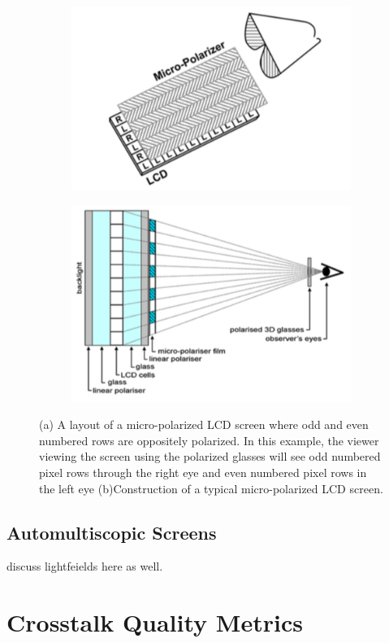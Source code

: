 \begin{figure}[htbp]
\centering
     \begin{subfigure}[b]{0.6\textwidth}
        \includegraphics[width=\textwidth]{./Template_Figures/polarized_lcd}
        \caption{ }\label{fig:polarized_lcd}
    \end{subfigure}
    \begin{subfigure}[b]{0.6\textwidth}
        \includegraphics[width=\textwidth]{./Template_Figures/polarized_lcd_problem}
        \caption{ }\label{fig:polarized_lcd_prob}
    \end{subfigure}

    \caption{(a) A layout of a micro-polarized LCD screen where odd and even numbered rows are oppositely polarized. In this example, the viewer viewing the screen using the polarized glasses will see odd numbered pixel rows through the right eye and even numbered pixel rows in the left eye \cite{woods2012crosstalk} (b){Construction of a typical micro-polarized LCD screen}.\label{fig:LCD_refresh}}
\end{figure}

\subsection{Automultiscopic Screens}
discuss lightfeields here as well.

\section{Crosstalk Quality Metrics}